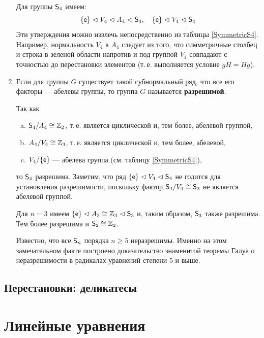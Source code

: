 \begin{enumerate}
Для группы ${\mathsf{S}}_4$ имеем: 
$$
\{\mathsf e\}\vartriangleleft V_4\vartriangleleft A_4\vartriangleleft{\mathsf{S}}_4,\quad\{\mathsf e\}\vartriangleleft V_4\vartriangleleft{\mathsf{S}}_4
$$
Эти утверждения можно извлечь непосредственно из таблицы \ref{SymmetricS4}. Например, нормальность $V_4$ в $A_4$ следует из того, что симметричные столбец и строка в зеленой области напротив и под группой $V_4$ совпадают с точностью до перестановки элементов (т.\,е. выполняется условие $gH=Hg$).

\item Если для группы $G$ существует такой субнормальный ряд, что все его факторы --- абелевы группы, то группа $G$ называется \textbf{разрешимой}.

Так как
\begin{enumerate}[a)]
\item ${\mathsf{S}}_4/A_4\cong\mathbb Z_2$, т.\,е. является циклической и, тем более, абелевой группой,
\item $A_4/V_4\cong\mathbb Z_3$, т.\,е. является циклической и, тем более, абелевой,
\item $V_4/\{\mathsf e\}$ --- абелева группа (см. таблицу \ref{SymmetricS4}),
\end{enumerate}
то ${\mathsf{S}}_4$ разрешима. Заметим, что ряд $\{\mathsf e\}\vartriangleleft V_4\vartriangleleft{\mathsf{S}}_4$ не годится для установления разрешимости, поскольку фактор ${\mathsf{S}}_4/V_4\cong{\mathsf{S}}_3$ не является абелевой группой.

Для $n=3$ имеем $\{\mathsf e\}\vartriangleleft A_3\cong\mathbb Z_3\vartriangleleft{\mathsf{S}}_3$ и, таким образом, ${\mathsf{S}}_3$ также разрешима. Тем более разрешима и ${\mathsf{S}}_2\cong\mathbb Z_2$.

Известно, что все ${\mathsf{S}}_n$ порядка $n\ge 5$ неразрешимы. Именно на этом замечательном факте построено доказательство знаменитой теоремы Галуа о неразрешимости в радикалах уравнений степени 5 и выше.

\end{enumerate}







\section{Перестановки: деликатесы}




\chapter{Линейные уравнения}

